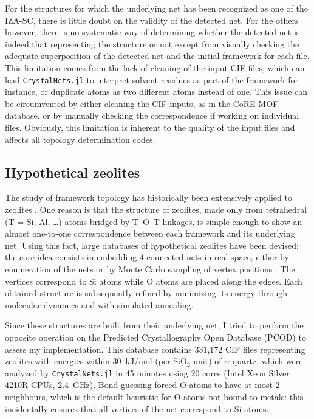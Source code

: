\documentclass[main.tex]{subfiles}
\begin{document}
For the structures for which the underlying net has been recognized as one of the IZA-SC, there is little doubt on the validity of the detected net. For the others however, there is no systematic way of determining whether the detected net is indeed that representing the structure or not except from visually checking the adequate superposition of the detected net and the initial framework for each file. This limitation comes from the lack of cleaning of the input CIF files, which can lead \texttt{CrystalNets.jl} to interpret solvent residues as part of the framework for instance, or duplicate atoms as two different atoms instead of one. This issue can be circumvented by either cleaning the CIF inputs, as in the CoRE MOF database, or by manually checking the correspondence if working on individual files. Obviously, this limitation is inherent to the quality of the input files and affects all topology determination codes.

\subsection{Hypothetical zeolites}


The study of framework topology has historically been extensively applied to zeolites \autocite{TopochemistryZeolites}. One reason is that the structure of zeolites, made only from tetrahedral (T = Si, Al, \ldots) atoms bridged by T--O--T linkages, is simple enough to show an almost one-to-one correspondence between each framework and its underlying net. Using this fact, large databases of hypothetical zeolites have been devised: the core idea consists in embedding 4-connected nets in real space, either by enumeration of the nets \autocite{Treacy} or by Monte Carlo sampling of vertex positions \autocite{Deem}. The vertices correspond to Si atoms while O atoms are placed along the edges. Each obtained structure is subsequently refined by minimizing its energy through molecular dynamics and with simulated annealing.

Since these structures are built from their underlying net, I tried to perform the opposite operation on the Predicted Crystallography Open Database (PCOD) \autocite{Deem} to assess my implementation. This database contains 331,172 CIF files representing zeolites with energies within \SI{30}{kJ/mol} (per SiO$_2$ unit) of $\alpha$-quartz, which were analyzed by \texttt{CrystalNets.jl} in 45 minutes using 20 cores (Intel Xeon Silver 4210R CPUs, 2.4~GHz). Bond guessing forced O atoms to have at most 2 neighbours, which is the default heuristic for O atoms not bound to metals: this incidentally ensures that all vertices of the net correspond to Si atoms.
\end{document}
